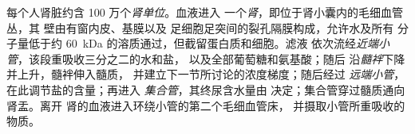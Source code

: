\begin{definition}[肾单位]\label{def:b3:renal-osmoregulation:nephron}
每个人肾脏约含 100 万个\emph{肾单位}。血液进入
一个\emph{肾}，即位于肾小囊内的毛细血管丛，其
壁由有窗内皮、基膜以及
足细胞足突间的裂孔隔膜构成，允许水及所有
分子量低于约 \qty{60}{kDa} 的溶质通过，但截留蛋白质和细胞。滤液
依次流经\emph{近端小管}，该段重吸收三分之二的水和盐，
以及全部葡萄糖和氨基酸；随后
沿\emph{髓袢}下降并上升，髓袢伸入髓质，
并建立下一节所讨论的浓度梯度；随后经过
\emph{远端小管}，在此调节盐的含量；再进入
\emph{集合管}，其终尿含水量由
决定；集合管穿过髓质通向肾盂。离开
肾的血液进入环绕小管的第二个毛细血管床，
并摄取小管所重吸收的物质。
\end{definition}

